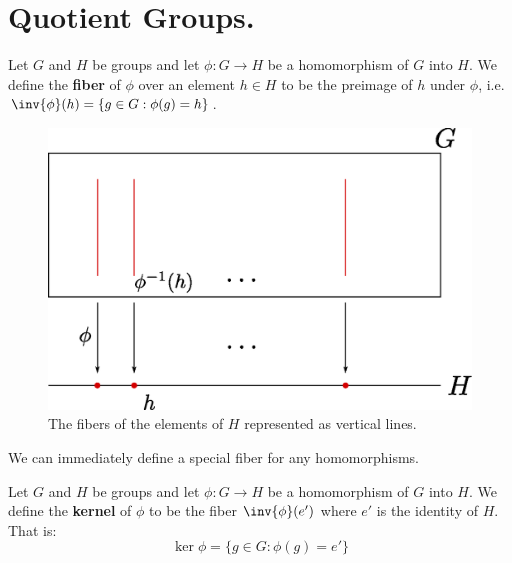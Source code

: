
\section{Quotient Groups.}
\label{section1}

\begin{definition}
    Let $G$ and $H$ be groups and let $\phi:G \rightarrow H$ be a homomorphism
    of $G$ into  $H$. We define the \textbf{fiber} of $\phi$ over an element $h
    \in H$ to be the preimage of  $h$ under  $\phi$, i.e.  $\inv{\phi}(h)=\{g
    \in G : \phi(g)=h\}$.
\end{definition}

\begin{figure}[h]
    \centering
    \includegraphics[scale = 0.5]{Figures/chapter3/fibers.eps}
    \caption{The fibers of the elements of $H$ represented as vertical lines.}
    \label{fig_3.1}
\end{figure}

We can immediately define a special fiber for any homomorphisms.

\begin{definition}
    Let $G$ and  $H$ be groups and let  $\phi:G \rightarrow H$ be a homomorphism
    of $G$ into  $H$. We define the \textbf{kernel} of $\phi$ to be the fiber
    $\inv{\phi}(e')$ where $e'$ is the identity of  $H$. That is:
    \begin{equation}
        \ker{\phi}=\{g \in G : \phi(g)=e'\}
    \end{equation}
\end{definition}

